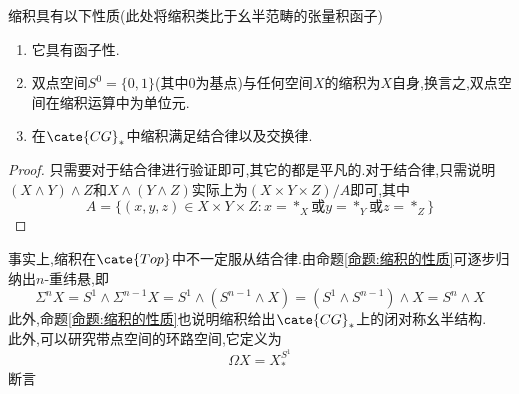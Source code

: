\begin{proposition}\label{命题:缩积的性质}
    缩积具有以下性质(此处将缩积类比于幺半范畴的张量积函子)
    \begin{enumerate}
        \item 它具有函子性.
        \item 双点空间$S^0=\{0,1\}$(其中$0$为基点)与任何空间$X$的缩积为$X$自身,换言之,双点空间在缩积运算中为单位元.
        \item 在$\cate{CG}_*$中缩积满足结合律以及交换律.
    \end{enumerate}
\end{proposition}
\begin{proof}
    只需要对于结合律进行验证即可,其它的都是平凡的.对于结合律,只需说明$(X\land Y) \land Z$和$X\land(Y \land Z)$实际上为$(X\times Y \times Z)/A$即可,其中
    \[
    A = \{(x,y,z)\in X \times Y \times Z: x= *_X \text{或} y = *_Y \text{或} z = *_Z\}
    \]
\end{proof}
事实上,缩积在$\cate{Top}$中不一定服从结合律.由命题\ref{命题:缩积的性质}可逐步归纳出$n$-重纬悬,即
\[
 \Sigma^n X = S^1 \land \Sigma^{n-1}X = S^1\land(S^{n-1}\land X) = (S^{1}\land S^{n-1})\land X = S^n \land X
\]
此外,命题\ref{命题:缩积的性质}也说明缩积给出$\cate{CG}_*$上的闭对称幺半结构.\\
此外,可以研究带点空间的环路空间,它定义为
\[
    \Omega X = X_*^{S^1}
\]
断言
